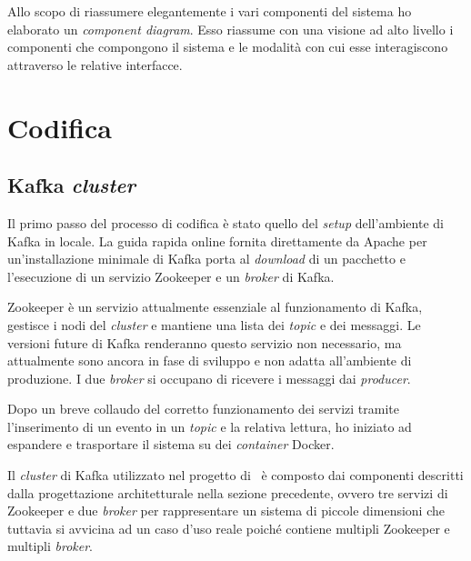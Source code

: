 Allo scopo di riassumere elegantemente i vari componenti del sistema ho elaborato un  \textit{component diagram}.
Esso riassume con una visione ad alto livello i componenti che compongono il sistema e le modalità con cui esse interagiscono attraverso le relative interfacce.






\section{Codifica}

\subsection{Kafka \textit{cluster}}

Il primo passo del processo di codifica è stato quello del \textit{setup} dell'ambiente di Kafka in locale.
La guida rapida online fornita direttamente da Apache per un'installazione minimale di Kafka porta al \textit{download} di un pacchetto e l'esecuzione di un servizio Zookeeper e un \textit{broker} di Kafka.

Zookeeper è un servizio attualmente essenziale al funzionamento di Kafka, gestisce i nodi del \textit{cluster} e mantiene una lista dei \textit{topic} e dei messaggi.
Le versioni future di Kafka renderanno questo servizio non necessario, ma attualmente sono ancora in fase di sviluppo e non adatta all'ambiente di produzione.
I due \textit{broker} si occupano di ricevere i messaggi dai \textit{producer}.

Dopo un breve collaudo del corretto funzionamento dei servizi tramite l'inserimento di un evento in un \textit{topic} e la relativa lettura, ho iniziato ad espandere e trasportare il sistema su dei \textit{container} Docker.

Il \textit{cluster} di Kafka utilizzato nel progetto di \stage\ è composto dai componenti descritti dalla progettazione architetturale nella sezione precedente, ovvero tre servizi di Zookeeper e due \textit{broker} per rappresentare un sistema di piccole dimensioni che tuttavia si avvicina ad un caso d'uso reale poiché contiene multipli Zookeeper e multipli \textit{broker}.

